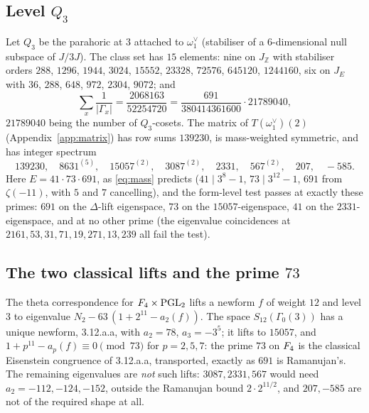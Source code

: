 \documentclass[11pt]{amsart}
\theoremstyle{definition}
\newcommand{\Z}{\mathbb{Z}}\newcommand{\Q}{\mathbb{Q}}\newcommand{\R}{\mathbb{R}}\newcommand{\A}{\mathbb{A}}\newcommand{\F}{\mathbb{F}}
\begin{document}
\subsection{Level $Q_3$} Let $Q_3$ be the parahoric at $3$ attached to $\omega_1^\vee$ (stabiliser of a $6$-dimensional null subspace of $J/3J$). The class set has $15$ elements: nine on $J_\Z$ with stabiliser orders $288$, $1296$, $1944$, $3024$, $15552$, $23328$, $72576$, $645120$, $1244160$, six on $J_E$ with $36$, $288$, $648$, $972$, $2304$, $9072$; and
\[\sum_x\frac1{|\Gamma_x|}=\frac{2068163}{52254720}=\frac{691}{380414361600}\cdot21789040,\]
$21789040$ being the number of $Q_3$-cosets. The matrix of $T(\omega_1^\vee)(2)$ (Appendix~\ref{app:matrix}) has row sums $139230$, is mass-weighted symmetric, and has integer spectrum
\[139230,\quad 8631^{(5)},\quad 15057^{(2)},\quad 3087^{(2)},\quad 2331,\quad 567^{(2)},\quad 207,\quad -585.\]
Here $E=41\cdot73\cdot691$, as \eqref{eq:mass} predicts ($41\mid3^8-1$, $73\mid3^{12}-1$, $691$ from $\zeta(-11)$, with $5$ and $7$ cancelling), and the form-level test passes at exactly these primes: $691$ on the $\Delta$-lift eigenspace, $73$ on the $15057$-eigenspace, $41$ on the $2331$-eigenspace, and at no other prime (the eigenvalue coincidences at $2161,53,31,71,19,271,13,239$ all fail the test).

\subsection{The two classical lifts and the prime $73$} The theta correspondence for $F_4\times\mathrm{PGL}_2$ \cite{Shan} lifts a newform $f$ of weight $12$ and level $3$ to eigenvalue $N_2-63\,(1+2^{11}-a_2(f))$. The space $S_{12}(\Gamma_0(3))$ has a unique newform, \textsf{3.12.a.a}, with $a_2=78$, $a_3=-3^5$; it lifts to $15057$, and $1+p^{11}-a_p(f)\equiv0\pmod{73}$ for $p=2,5,7$: the prime $73$ on $F_4$ is the classical Eisenstein congruence of \textsf{3.12.a.a}, transported, exactly as $691$ is Ramanujan's. The remaining eigenvalues are \emph{not} such lifts: $3087,2331,567$ would need $a_2=-112,-124,-152$, outside the Ramanujan bound $2\cdot2^{11/2}$, and $207,-585$ are not of the required shape at all.
\end{document}
